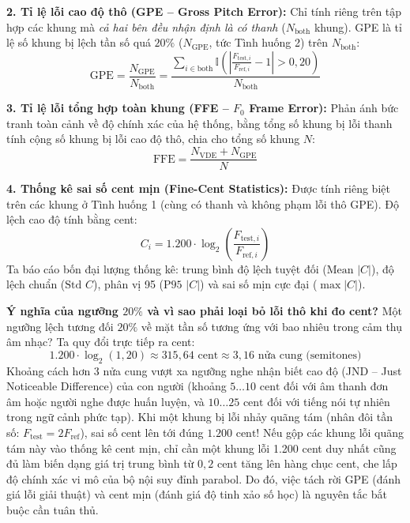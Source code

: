 \textbf{2. Tỉ lệ lỗi cao độ thô (GPE -- Gross Pitch Error):}
Chỉ tính riêng trên tập hợp các khung mà \emph{cả hai bên đều nhận định là có thanh} ($N_{\text{both}}$ khung). GPE là tỉ lệ số khung bị lệch tần số quá $20\%$ ($N_{\text{GPE}}$, tức Tình huống 2) trên $N_{\text{both}}$:
\begin{equation}
\text{GPE} = \frac{N_{\text{GPE}}}{N_{\text{both}}} = \frac{\sum_{i \in \text{both}} \mathbb{I}\left( \left| \frac{F_{\text{test},i}}{F_{\text{ref},i}} - 1 \right| > 0{,}20 \right)}{N_{\text{both}}}
\end{equation}

\textbf{3. Tỉ lệ lỗi tổng hợp toàn khung (FFE -- $F_0$ Frame Error):}
Phản ánh bức tranh toàn cảnh về độ chính xác của hệ thống, bằng tổng số khung bị lỗi thanh tính cộng số khung bị lỗi cao độ thô, chia cho tổng số khung $N$:
\begin{equation}
\text{FFE} = \frac{N_{\text{VDE}} + N_{\text{GPE}}}{N}
\end{equation}

\textbf{4. Thống kê sai số cent mịn (Fine-Cent Statistics):}
Được tính riêng biệt trên các khung ở Tình huống 1 (cùng có thanh và không phạm lỗi thô GPE). Độ lệch cao độ tính bằng cent:
\begin{equation}
C_i = 1.200 \cdot \log_2 \left( \frac{F_{\text{test},i}}{F_{\text{ref},i}} \right)
\end{equation}
Ta báo cáo bốn đại lượng thống kê: trung bình độ lệch tuyệt đối ($\text{Mean } |C|$), độ lệch chuẩn ($\text{Std } C$), phân vị 95 ($\text{P95 } |C|$) và sai số mịn cực đại ($\max |C|$).

\textbf{Ý nghĩa của ngưỡng $20\%$ và vì sao phải loại bỏ lỗi thô khi đo cent?}
Một ngưỡng lệch tương đối $20\%$ về mặt tần số tương ứng với bao nhiêu trong cảm thụ âm nhạc? Ta quy đổi trực tiếp ra cent:
\begin{equation}
1.200 \cdot \log_2(1{,}20) \approx 315{,}64\text{ cent} \approx 3{,}16\text{ nửa cung (semitones)}
\end{equation}
Khoảng cách hơn 3 nửa cung vượt xa ngưỡng nghe nhận biết cao độ (JND -- Just Noticeable Difference) của con người (khoảng $5 \dots 10\text{ cent}$ đối với âm thanh đơn âm hoặc người nghe được huấn luyện, và $10 \dots 25\text{ cent}$ đối với tiếng nói tự nhiên trong ngữ cảnh phức tạp). Khi một khung bị lỗi nhảy quãng tám (nhân đôi tần số: $F_{\text{test}} = 2 F_{\text{ref}}$), sai số cent lên tới đúng $1.200\text{ cent}$! Nếu gộp các khung lỗi quãng tám này vào thống kê cent mịn, chỉ cần một khung lỗi 1.200 cent duy nhất cũng đủ làm biến dạng giá trị trung bình từ $0{,}2\text{ cent}$ tăng lên hàng chục cent, che lấp độ chính xác vi mô của bộ nội suy đỉnh parabol. Do đó, việc tách rời GPE (đánh giá lỗi giải thuật) và cent mịn (đánh giá độ tinh xảo số học) là nguyên tắc bắt buộc cần tuân thủ.

